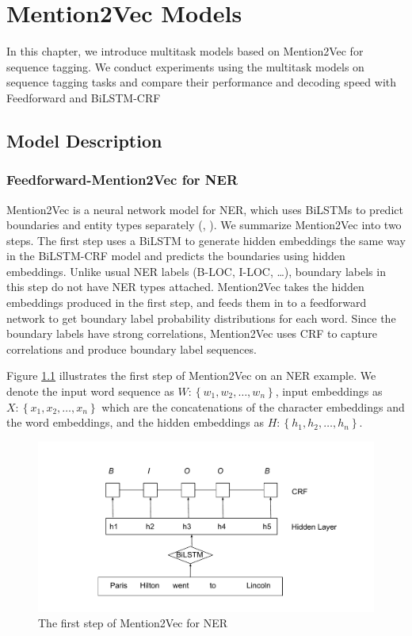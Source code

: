 \chapter{Mention2Vec Models}

In this chapter, we introduce multitask models based on Mention2Vec for sequence tagging. We conduct experiments using the multitask models on sequence tagging tasks and compare their performance and decoding speed with Feedforward and BiLSTM-CRF

\section{Model Description}

\subsection{Feedforward-Mention2Vec for NER}

Mention2Vec is a neural network model for NER, which uses BiLSTMs to predict boundaries and entity types separately (\citeauthor{stratos2016mention2vec}, \citeyear{stratos2016mention2vec}). We summarize Mention2Vec into two steps. The first step uses a BiLSTM to generate hidden embeddings the same way in the BiLSTM-CRF model and predicts the boundaries using hidden embeddings. Unlike usual NER labels (B-LOC, I-LOC, \dots), boundary labels in this step do not have NER types attached. Mention2Vec takes the hidden embeddings produced in the first step, and feeds them in to a feedforward network to get boundary label probability distributions for each word. Since the boundary labels have strong correlations, Mention2Vec uses CRF to capture correlations and produce boundary label sequences.

Figure \ref{fig:mention2vec1} illustrates the first step of Mention2Vec on an NER example. We denote the input word sequence as $W: \left\{w_{1}, w_{2}, \dots, w_{n}\right\}$, input embeddings as $X: \left\{x_{1}, x_{2}, \dots, x_{n}\right\}$ which are the concatenations of the character embeddings and the word embeddings, and the hidden embeddings as $H: \left\{h_{1}, h_{2}, \dots, h_{n}\right\}$. 

\begin{figure}
  \centering
  \includegraphics[scale=0.6]{mention2vec1.pdf}
 \caption{The first step of Mention2Vec for NER}
  \label{fig:mention2vec1}
\end{figure}

